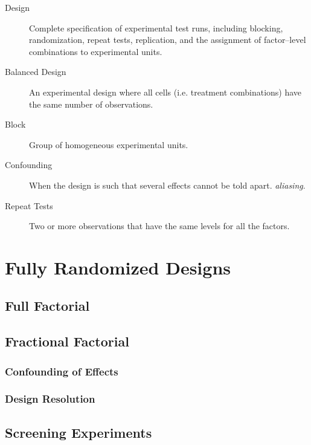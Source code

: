 \begin{description}
\item [Design]  Complete specification of experimental test runs, including blocking, randomization, repeat tests, replication, and the assignment of factor–level combinations to experimental units.

\item [Balanced Design] An experimental design where all cells (i.e. treatment combinations) have the same number of observations.

\item [Block] Group of homogeneous experimental units.

\item [Confounding] When the design is such that several effects cannot be told apart. \Aka \emph{aliasing}.

\item [Repeat Tests] Two or more observations that have the same levels for all the
factors.

\end{description}







\section{Fully Randomized Designs}

\subsection{Full Factorial}



\subsection{Fractional Factorial}

\subsubsection{Confounding of Effects}

\subsubsection{Design Resolution}


\subsection{Screening Experiments}

